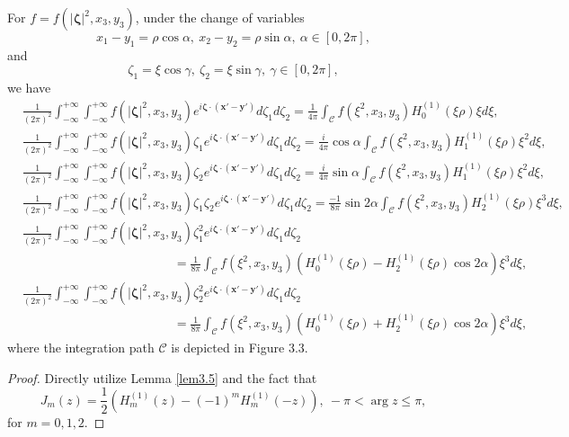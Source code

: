 \documentclass[final,reqno]{siamltex}
\begin{document}
\begin{theorem}\label{thm3.6}
	For $f=f(|\boldsymbol{\zeta}|^2,x_3,y_3)$, under the change of variables 
	$$
	  x_1-y_1=\rho\cos\alpha,~x_2-y_2=\rho\sin\alpha,~\alpha\in[0,2\pi], 
	$$
	and
	$$
	  \zeta_1=\xi\cos\gamma,~\zeta_2=\xi\sin\gamma,~\gamma\in[0,2\pi], 
	$$
	we have 
	\begin{align*}
	  &\frac{1}{(2\pi)^2}\int_{-\infty}^{+\infty}\int_{-\infty}^{+\infty}f(|\boldsymbol{\zeta}|^2,x_3,y_3)e^{i\boldsymbol{\zeta}\cdot(\mathbf{x}'-\mathbf{y}')}d\zeta_1d\zeta_2=\frac{1}{4\pi}\int_{\mathcal{C}}f(\xi^2,x_3,y_3)H_0^{(1)}(\xi\rho)\xi d\xi, \\
	  &\frac{1}{(2\pi)^2}\int_{-\infty}^{+\infty}\int_{-\infty}^{+\infty}f(|\boldsymbol{\zeta}|^2,x_3,y_3)\zeta_1e^{i\boldsymbol{\zeta}\cdot(\mathbf{x}'-\mathbf{y}')}d\zeta_1d\zeta_2=\frac{i}{4\pi}\cos\alpha\int_{\mathcal{C}}f(\xi^2,x_3,y_3)H_1^{(1)}(\xi\rho)\xi^2d\xi, \\
	  &\frac{1}{(2\pi)^2}\int_{-\infty}^{+\infty}\int_{-\infty}^{+\infty}f(|\boldsymbol{\zeta}|^2,x_3,y_3)\zeta_2e^{i\boldsymbol{\zeta}\cdot(\mathbf{x}'-\mathbf{y}')}d\zeta_1d\zeta_2=\frac{i}{4\pi}\sin\alpha\int_{\mathcal{C}}f(\xi^2,x_3,y_3)H_1^{(1)}(\xi\rho)\xi^2d\xi, \\ 
	  &\frac{1}{(2\pi)^2}\int_{-\infty}^{+\infty}\int_{-\infty}^{+\infty}f(|\boldsymbol{\zeta}|^2,x_3,y_3)\zeta_1\zeta_2e^{i\boldsymbol{\zeta}\cdot(\mathbf{x}'-\mathbf{y}')}d\zeta_1d\zeta_2=\frac{-1}{8\pi}\sin2\alpha\int_{\mathcal{C}}f(\xi^2,x_3,y_3)H_2^{(1)}(\xi\rho)\xi^3d\xi, \\
	  &\frac{1}{(2\pi)^2}\int_{-\infty}^{+\infty}\int_{-\infty}^{+\infty}f(|\boldsymbol{\zeta}|^2,x_3,y_3)\zeta_1^2e^{i\boldsymbol{\zeta}\cdot(\mathbf{x}'-\mathbf{y}')}d\zeta_1d\zeta_2 \\
	  &\qquad\qquad\qquad\qquad\qquad\qquad=\frac{1}{8\pi}\int_{\mathcal{C}}f(\xi^2,x_3,y_3)(H_0^{(1)}(\xi\rho)-H_2^{(1)}(\xi\rho)\cos2\alpha)\xi^3d\xi, \\
	  &\frac{1}{(2\pi)^2}\int_{-\infty}^{+\infty}\int_{-\infty}^{+\infty}f(|\boldsymbol{\zeta}|^2,x_3,y_3)\zeta_2^2e^{i\boldsymbol{\zeta}\cdot(\mathbf{x}'-\mathbf{y}')}d\zeta_1d\zeta_2 \\
	  &\qquad\qquad\qquad\qquad\qquad\qquad=\frac{1}{8\pi}\int_{\mathcal{C}}f(\xi^2,x_3,y_3)(H_0^{(1)}(\xi\rho)+H_2^{(1)}(\xi\rho)\cos2\alpha)\xi^3d\xi, 
	\end{align*}
	where the integration path $\mathcal{C}$ is depicted in Figure {\rm 3.3}. 
\end{theorem}
\begin{proof}
	Directly utilize Lemma \ref{lem3.5} and the fact that \cite{GN95} 
	$$
	  J_m(z)=\frac{1}{2}(H_m^{(1)}(z)-(-1)^mH_m^{(1)}(-z)),~-\pi<\arg z\leq\pi, 
	$$
	for $m=0,1,2$. 
\end{proof}
\end{document}
